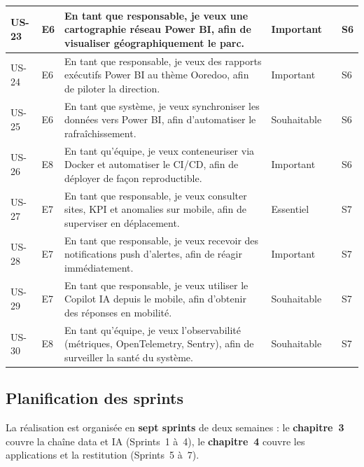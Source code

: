 \documentclass[12pt,a4paper]{report}
\begin{document}
{\begin{longtable}{|>{\centering\arraybackslash}p{0.95cm}|>{\centering\arraybackslash}p{0.8cm}|p{6.2cm}|>{\centering\arraybackslash}p{1.7cm}|>{\centering\arraybackslash}p{0.75cm}|>{\centering\arraybackslash}p{1.35cm}|}
US-23 & E6 & En tant que responsable, je veux une cartographie réseau Power BI, afin de visualiser géographiquement le parc. & Important & 8 & S6 \\ \hline
US-24 & E6 & En tant que responsable, je veux des rapports exécutifs Power BI au thème Ooredoo, afin de piloter la direction. & Important & 5 & S6 \\ \hline
US-25 & E6 & En tant que système, je veux synchroniser les données vers Power BI, afin d'automatiser le rafraîchissement. & Souhaitable & 5 & S6 \\ \hline
US-26 & E8 & En tant qu'équipe, je veux conteneuriser via Docker et automatiser le CI/CD, afin de déployer de façon reproductible. & Important & 5 & S6 \\ \hline
US-27 & E7 & En tant que responsable, je veux consulter sites, KPI et anomalies sur mobile, afin de superviser en déplacement. & Essentiel & 8 & S7 \\ \hline
US-28 & E7 & En tant que responsable, je veux recevoir des notifications push d'alertes, afin de réagir immédiatement. & Important & 5 & S7 \\ \hline
US-29 & E7 & En tant que responsable, je veux utiliser le Copilot IA depuis le mobile, afin d'obtenir des réponses en mobilité. & Souhaitable & 5 & S7 \\ \hline
US-30 & E8 & En tant qu'équipe, je veux l'observabilité (métriques, OpenTelemetry, Sentry), afin de surveiller la santé du système. & Souhaitable & 3 & S7 \\ \hline
\end{longtable}
}

\subsection{Planification des sprints}\label{sec:ch2-planif}

La réalisation est organisée en \textbf{sept sprints} de deux semaines : le \textbf{chapitre~3} couvre la chaîne data et IA (Sprints~1 à~4), le \textbf{chapitre~4} couvre les applications et la restitution (Sprints~5 à~7).
\end{document}
